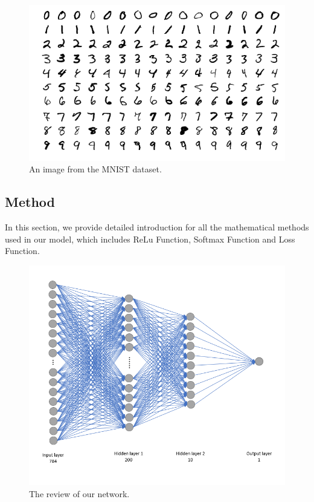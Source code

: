 \documentclass[twoside,twocolumn]{article}
\begin{document}
\begin{figure}[]
	\centering
	\includegraphics[width=1.0\columnwidth, clip=true]{fig/mnist.png}
	\vspace{-4mm}
	\caption{An image from the MNIST dataset.}
	\label{fig:mnist}
	\vspace{-5mm}
\end{figure}

\subsection{Method}

In this section, we provide detailed introduction for all the mathematical methods used in our model, which includes ReLu Function, Softmax Function and Loss Function.

\begin{figure}[ht]
	\centering
	\includegraphics[scale=0.5, clip=true]{fig/network.png}
	\vspace{-2mm}
	\caption{The review of our network.}
	\label{fig:model}
	\vspace{-5mm}
\end{figure}
\end{document}
